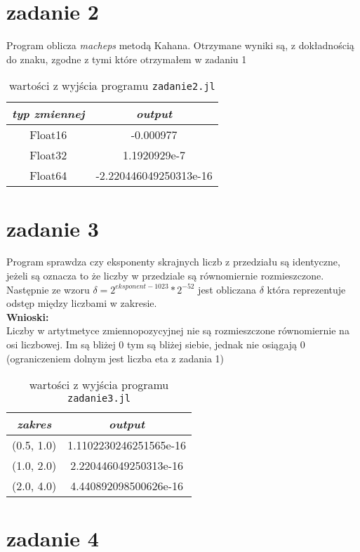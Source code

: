 \documentclass[11pt, a4paper]{article}
\begin{document}
  \section*{zadanie 2}
  Program oblicza \emph{macheps} metodą Kahana. Otrzymane wyniki są, z dokładnością do znaku, zgodne z tymi które otrzymałem w zadaniu 1
  \begin{table}[ht]
    \centering
    \begin{tabular}{|c|c|}
      \hline
      \emph{typ zmiennej} & \emph{output} \\
      \hline
      Float16 &  -0.000977 \\
      Float32 &  1.1920929e-7 \\
      Float64 &  -2.220446049250313e-16 \\
      \hline
    \end{tabular}
    \caption{wartości z wyjścia programu \texttt{zadanie2.jl}}
  \end{table}

  \section*{zadanie 3}
  Program sprawdza czy eksponenty skrajnych liczb z przedziału są identyczne, jeżeli są oznacza to że liczby w przedziale są równomiernie rozmieszczone. 
  Następnie ze wzoru $ \delta = 2^{eksponent - 1023} * 2^{-52} $ jest obliczana $\delta$ która reprezentuje odstęp między liczbami w zakresie.\\
  \textbf{Wnioski:}\\
  Liczby w artytmetyce zmiennopozycyjnej nie są rozmieszczone równomiernie na osi liczbowej. Im są bliżej 0 tym są bliżej siebie, jednak nie osiągają 0 (ograniczeniem dolnym jest liczba eta z zadania 1)
  
  \begin{table}[ht]
    \centering
    \begin{tabular}{|c|c|}
      \hline
      \emph{zakres} & \emph{output} \\
      \hline
      (0.5, 1.0) & 1.1102230246251565e-16 \\
      (1.0, 2.0) & 2.220446049250313e-16 \\
      (2.0, 4.0) & 4.440892098500626e-16 \\
      \hline
    \end{tabular}
    \caption{wartości z wyjścia programu \texttt{zadanie3.jl}}
  \end{table}

  \section*{zadanie 4}
\end{document}
